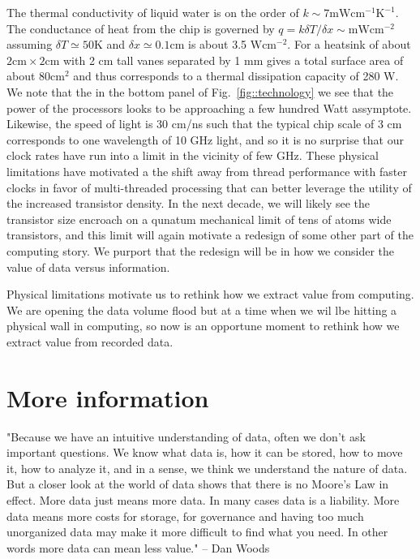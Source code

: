 \documentclass{article}
\begin{document}
The thermal conductivity of liquid water is on the order of $k \sim 7 \mbox{mW} \mbox{cm}^{-1} \mbox{K}^{-1}$.
The conductance of heat from the chip is governed by $q = k \delta T / \delta x \sim \mbox{mW} \mbox{cm}^{-2}$ assuming $\delta T \simeq 50 \mbox{K}$ and $\delta x \simeq 0.1 \mbox{cm}$ is about 3.5 $\mbox{W} \mbox{cm}^{-2}$.
For a heatsink of about $2\mbox{cm}\times2\mbox{cm}$ with 2 cm tall vanes separated by 1 mm gives a total surface area of about $80 \mbox{cm}^{2}$ and thus corresponds to a thermal dissipation capacity of 280 W.
We note that the in the bottom panel of Fig.~\ref{fig::technology} we see that the power of the processors looks to be approaching a few hundred Watt assymptote.
Likewise, the speed of light is 30 cm/ns such that the typical chip scale of 3 cm corresponds to one wavelength of 10 GHz light, and so it is no surprise that our clock rates have run into a limit in the vicinity of few GHz.
These physical limitations have motivated a the shift away from thread performance with faster clocks in favor of multi-threaded processing that can better leverage the utility of the increased transistor density.
In the next decade, we will likely see the transistor size encroach on a qunatum mechanical limit of tens of atoms wide transistors, and this limit will again motivate a redesign of some other part of the computing story.
We purport that the redesign will be in how we consider the value of data versus information.

Physical limitations motivate us to rethink how we extract value from computing.  
We are opening the data volume flood but at a time when we wil lbe hitting a physical wall in computing, so now is an opportune moment to rethink how we extract value from recorded data.



\section{More information}
"Because we have an intuitive understanding of data, often we don’t ask important questions. We
know what data is, how it can be stored, how to move it, how to analyze it, and in a sense, we
think we understand the nature of data.
But a closer look at the world of data shows that there is no Moore’s Law in effect. More data
just means more data. In many cases data is a liability. More data means more costs for storage,
for governance and having too much unorganized data may make it more difficult to find what
you need. In other words more data can mean less value." -- Dan Woods \cite{Woods2013}
\end{document}
